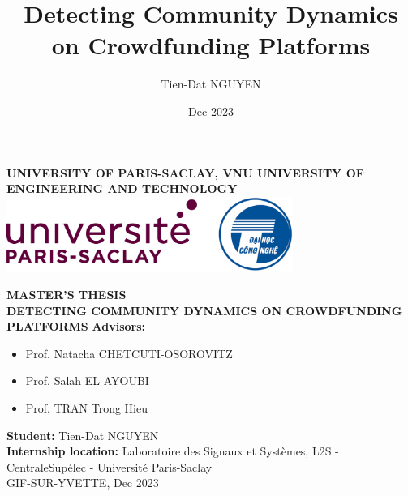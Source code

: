 \title{Detecting Community Dynamics on Crowdfunding Platforms}
\author{Tien-Dat NGUYEN}
\date{Dec 2023}

\begin{titlepage}
	\centering
	\vspace*{1cm}

	{\Large \textbf{UNIVERSITY OF PARIS-SACLAY, VNU UNIVERSITY OF ENGINEERING AND TECHNOLOGY}}\\[1cm]

	\includegraphics[width=0.7\textwidth]{images/logo_combine.png}
	\vspace*{5cm}


	{\Large \textbf{MASTER'S THESIS}}\\[0.5cm]

	{\Huge \textbf{DETECTING COMMUNITY DYNAMICS ON CROWDFUNDING PLATFORMS}}
	\vspace*{2cm}
	{\large \textbf{Advisors:}}
	\begin{large}
		\begin{itemize}
			\item Prof. Natacha CHETCUTI-OSOROVITZ
			\item Prof. Salah EL AYOUBI
			\item Prof. TRAN Trong Hieu
		\end{itemize}
	\end{large}
	\vspace*{1cm}
	{\large \textbf{Student:} Tien-Dat NGUYEN}\\[0.5cm]

	{\large \textbf{Internship location:} Laboratoire des Signaux et Systèmes, L2S - CentraleSupélec - Université Paris-Saclay}\\[0.25cm]

	{\large GIF-SUR-YVETTE, Dec 2023 }\\[0.25cm]


	\vfill
\end{titlepage}